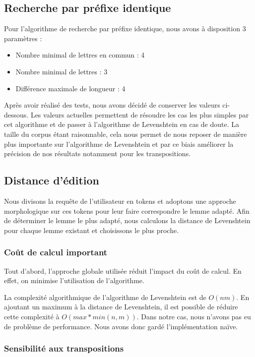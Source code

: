 \documentclass[a4paper]{elsarticle}
\begin{document}
\subsection{Recherche par préfixe identique}

Pour l'algorithme de recherche par préfixe identique, nous avons à disposition 3 paramètres :
\begin{itemize}
\item Nombre minimal de lettres en commun : 4
\item Nombre minimal de lettres : 3
\item Différence maximale de longueur : 4
\end{itemize}

Après avoir réalisé des tests, nous avons décidé de conserver les valeurs ci-dessous. Les valeurs actuelles permettent de résoudre les cas les plus simples par cet algorithme et de passer à l'algorithme de Levenshtein en cas de doute. La taille du corpus étant raisonnable, cela nous permet de nous reposer de manière plus importante sur l'algorithme de Levenshtein et par ce biais améliorer la précision de nos résultats notamment pour les transpositions.

\subsection{Distance d'édition}

Nous divisons la requête de l'utilisateur en tokens et adoptons une approche morphologique sur ces tokens pour leur faire correspondre le lemme adapté. Afin de déterminer le lemme le plus adapté, nous calculons la distance de Levenshtein \cite{levenshtein1966binary} pour chaque lemme existant et choisissons le plus proche.

\subsubsection{Coût de calcul important}

Tout d'abord, l'approche globale utilisée réduit l'impact du coût de calcul. En effet, on minimise l'utilisation de l'algorithme.

La complexité algorithmique de l'algorithme de Levenshtein est de $O(nm)$. En ajoutant un maximum à la distance de Levenshtein, il est possible de réduire cette complexité à $O(max * min(n, m))$. Dans notre cas, nous n'avons pas eu de problème de performance. Nous avons donc gardé l'implémentation naïve.

\subsubsection{Sensibilité aux transpositions}
\end{document}
